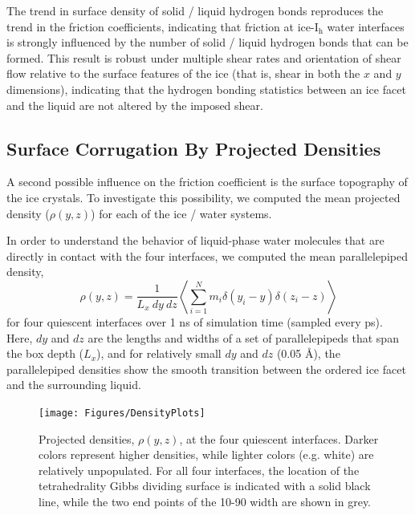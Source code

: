 The trend in surface density of solid / liquid hydrogen bonds
reproduces the trend in the friction coefficients, indicating that
friction at ice-I$_\mathrm{h}$ water interfaces is strongly influenced
by the number of solid / liquid hydrogen bonds that can be formed.
This result is robust under multiple shear rates and orientation of
shear flow relative to the surface features of the ice (that is, shear
in both the $x$ and $y$ dimensions), indicating that the hydrogen
bonding statistics between an ice facet and the liquid are not altered
by the imposed shear.

\subsection{Surface Corrugation By Projected Densities}
A second possible influence on the friction coefficient is the surface
topography of the ice crystals. To investigate this possibility, we
computed the mean projected density ($\rho(y,z)$) for each of the
ice / water systems.

In order to understand the behavior of liquid-phase water molecules
that are directly in contact with the four interfaces, we computed the
mean parallelepiped density,
\begin{equation}
\rho(y, z) = \frac{1}{L_x~dy~dz} \left< \sum_{i = 1}^{N} m_i \delta(y_i - y) \delta(z_i - z)\right>
\end{equation}
for four quiescent interfaces over 1 ns of simulation time (sampled
every ps).  Here, $dy$ and $dz$ are the lengths and widths of a set of
parallelepipeds that span the box depth ($L_x$), and for relatively
small $dy$ and $dz$ (0.05 \AA), the parallelepiped densities show the
smooth transition between the ordered ice facet and the surrounding
liquid.

\begin{figure}
\texttt{[image: Figures/DensityPlots]}
\caption{\label{fig:DensPlots} Projected densities, $\rho(y, z)$, at
  the four quiescent interfaces.  Darker colors represent higher
  densities, while lighter colors (e.g. white) are relatively
  unpopulated.  For all four interfaces, the location of the
  tetrahedrality Gibbs dividing surface is indicated with a solid
  black line, while the two end points of the 10-90 width are shown in
  grey.}
\end{figure}

